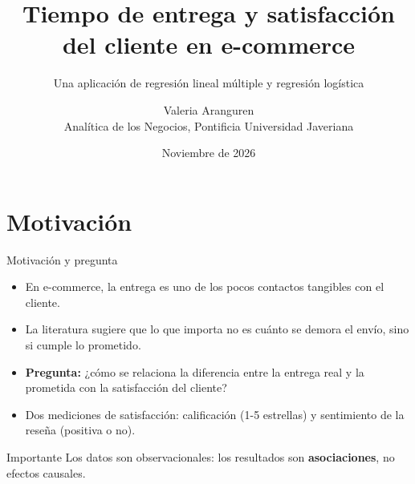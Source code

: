 \documentclass[11pt, aspectratio=169, table]{beamer}
\title[Entrega y satisfacción]{Tiempo de entrega y satisfacción del cliente en e-commerce}
\subtitle{Una aplicación de regresión lineal múltiple y regresión logística}
\author[Aranguren]{Valeria Aranguren\\[0.2em]
    {\small Analítica de los Negocios, Pontificia Universidad Javeriana}}
\date{Noviembre de 2026}
\begin{document}
\begin{frame}
    \titlepage
\end{frame}

\section{Motivación}
\begin{frame}{Motivación y pregunta}
    \begin{itemize}
        \setlength\itemsep{0.55em}
        \item En e-commerce, la entrega es uno de los pocos contactos tangibles con el cliente.
        \item La literatura sugiere que lo que importa no es cuánto se demora el envío, sino si cumple lo prometido.
        \item \textbf{Pregunta:} ¿cómo se relaciona la diferencia entre la entrega real y la prometida con la satisfacción del cliente?
        \item Dos mediciones de satisfacción: calificación (1-5 estrellas) y sentimiento de la reseña (positiva o no).
    \end{itemize}

    \vspace{0.3em}
    \begin{alertblock}{Importante}
        Los datos son observacionales: los resultados son \textbf{asociaciones}, no efectos causales.
    \end{alertblock}
\end{frame}

\end{document}
